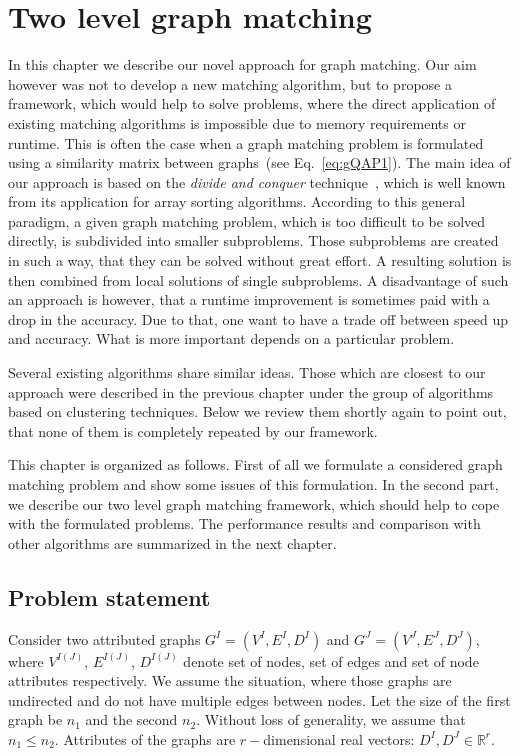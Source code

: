 \chapter{Two level graph matching} \label{chapter:2levelGM}
In this chapter we describe our novel approach for graph matching. Our aim however was not to develop a new matching algorithm, but to propose a framework, which would help to solve problems, where the direct application of existing matching algorithms is impossible due to memory requirements or runtime. This is often the case when a graph matching problem is formulated using a similarity matrix between graphs~(see Eq.~\eqref{eq:gQAP1}). The main idea of our approach is based on the \emph{divide and conquer} technique~\cite{Cormen}, which is well known from its application for array sorting algorithms. According to this general paradigm, a given graph matching problem, which is too difficult to be solved directly, is subdivided into smaller subproblems. Those subproblems are created in such a way, that they can be solved without great effort. A resulting solution is then combined from local solutions of single subproblems. A disadvantage of such an approach is however, that a runtime improvement is sometimes paid with a drop in the accuracy.
Due to that, one want to have a trade off between speed up and accuracy. What is more important depends on a particular problem.

Several existing algorithms share similar ideas. Those which are closest to our approach were described in the previous chapter under the group of algorithms based on clustering techniques. Below we review them shortly again to point out, that none of them is completely repeated by our framework.

This chapter is organized as follows. First of all we formulate a considered graph matching problem and show some issues of this formulation. In the second part, we describe our two level graph matching framework, which should help to cope with the formulated problems. The performance results and comparison with other algorithms are summarized in the next chapter. 
\section{Problem statement} \label{sec:prob_stat}
Consider two attributed graphs $G^I = (V^I, E^I, D^I)$ and $G^J = (V^J, E^J, D^J)$, where $V^{I(J)}$, $E^{I(J)}$, $D^{I(J)}$ denote set of nodes, set of edges and set of node attributes respectively. We assume the situation, where those graphs are undirected and do not have multiple edges between nodes. Let the size of the first graph be $n_1$ and the second $n_2$. Without loss of generality, we assume that $n_1\le n_2$. Attributes of the graphs are $r-$dimensional real vectors: $D^I,D^J\in\mathbb{R}^r$.

